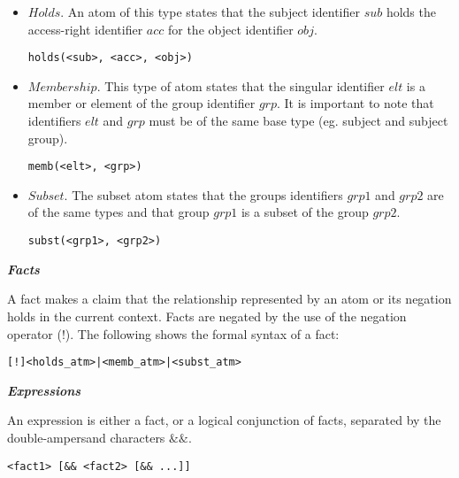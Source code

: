 \documentclass[10pt, twocolumn]{article}
\begin{document}
          \begin{itemize}
            \item
              $Holds$. An atom of this type states that the subject identifier
              $sub$ holds the access-right identifier $acc$ for the object
              identifier $obj$.
         
              \begin{verbatim}holds(<sub>, <acc>, <obj>)\end{verbatim}
            \item
              $Membership$. This type of atom states that the singular
              identifier $elt$ is a member or element of the group identifier
              $grp$. It is important to note that identifiers $elt$ and $grp$
              must be of the same base type (eg. subject and subject group).
         
              \begin{verbatim}memb(<elt>, <grp>)\end{verbatim}
            \item
              $Subset$. The subset atom states that the groups identifiers
              $grp1$ and $grp2$ are of the same types and that group $grp1$
              is a subset of the group $grp2$.

              \begin{verbatim}subst(<grp1>, <grp2>)\end{verbatim}
          \end{itemize}

        \noindent \textbf{\emph{Facts}}

          A fact makes a claim that the relationship represented by an atom or
          its negation holds in the current context. Facts are negated by the
          use of the negation operator ($!$). The following shows the formal
          syntax of a fact:
 
          \begin{verbatim}[!]<holds_atm>|<memb_atm>|<subst_atm>\end{verbatim}
 
        \noindent \textbf{\emph{Expressions}}

          An expression is either a fact, or a logical conjunction of facts,
          separated by the double-ampersand characters $\&\&$.

          \begin{verbatim}<fact1> [&& <fact2> [&& ...]]\end{verbatim}
\end{document}
